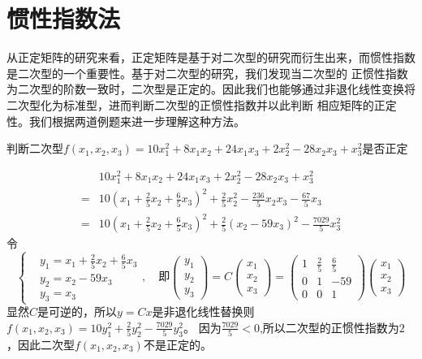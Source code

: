 \section{惯性指数法}
从正定矩阵的研究来看，正定矩阵是基于对二次型的研究而衍生出来，而惯性指数是二次型的一个重要性。基于对二次型的研究，我们发现当二次型的
正惯性指数为二次型的阶数一致时，二次型是正定的。因此我们也能够通过非退化线性变换将二次型化为标准型，进而判断二次型的正惯性指数并以此判断
相应矩阵的正定性。我们根据两道例题来进一步理解这种方法。
\begin{example}
  判断二次型$f(x_1,x_2,x_3)=10x_1^2 + 8x_1x_2 + 24x_1x_3 + 2x_2^2 - 28x_2x_3 + x_3^2$是否正定
\end{example}
\begin{solution}\[
    \begin{aligned}
    &10x_1^2 + 8x_1x_2 + 24x_1x_3 + 2x_2^2 - 28x_2x_3 + x_3^2 \\
    =&10(x_1+\frac{2}{5}x_2+\frac{6}{5}x_3)^2+\frac{2}{5}x_2^2-\frac{236}{5}x_2x_3-\frac{67}{5}x_3\\
    =&10(x_1+\frac{2}{5}x_2+\frac{6}{5}x_3)^2+\frac{2}{5}(x_2-59x_3)^2-\frac{7029}{5}x_3^2
  \end{aligned}\]
  令
  \begin{equation*}
    \left\{
    \begin{aligned}
      & y_1=x_1+\frac{2}{5}x_2+\frac{6}{5}x_3\\
      & y_2=x_2-59x_3\\
      & y_3=x_3
    \end{aligned}
    \right.,\quad \text{即}
  \begin{pmatrix}
    y_1\\y_2\\y_3
  \end{pmatrix}=C\begin{pmatrix}
    x_1\\x_2\\x_3
  \end{pmatrix}=\begin{pmatrix}
    1&\frac{2}{5}&\frac{6}{5}\\
    0&1&-59\\0&0&1
  \end{pmatrix}\begin{pmatrix}
    x_1\\x_2\\x_3
  \end{pmatrix}
  \end{equation*}
  显然$C$是可逆的，所以$y=Cx$是非退化线性替换则$f(x_1,x_2,x_3)=10y_1^2+\frac{2}{5}y_2^2-\frac{7029}{5}y_3^2$。
  因为$\frac{7029}{5}<0$,所以二次型的正惯性指数为$2$，因此二次型$f(x_1,x_2,x_3)$不是正定的。
  

\end{solution}

